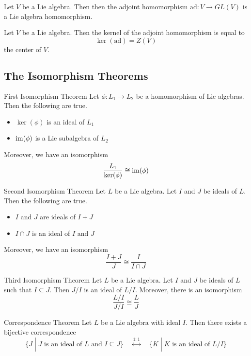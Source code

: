 \documentclass[a4paper]{article}
\begin{document}
\begin{lmm}{}{} Let $V$ be a Lie algebra. Then then the adjoint homomorphism $\text{ad}:V\to GL(V)$ is a Lie algebra homomorphism. 
\end{lmm}

\begin{lmm}{}{} Let $V$ be a Lie algebra. Then the kernel of the adjoint homomorphism is equal to $$\ker(\text{ad})=Z(V)$$ the center of $V$. 
\end{lmm}

\subsection{The Isomorphism Theorems}
\begin{thm}{First Isomorphism Theorem}{} Let $\phi:L_1\to L_2$ be a homomorphism of Lie algebras. Then the following are true. 
\begin{itemize}
\item $\ker(\phi)$ is an ideal of $L_1$
\item $\operatorname{im}(\phi)$ is a Lie subalgebra of $L_2$
\end{itemize}
Moreover, we have an isomorphism $$\frac{L_1}{\ker(\phi)}\cong\operatorname{im}(\phi)$$
\end{thm}

\begin{thm}{Second Isomorphism Theorem}{} Let $L$ be a Lie algebra. Let $I$ and $J$ be ideals of $L$. Then the following are true. 
\begin{itemize}
\item $I$ and $J$ are ideals of $I+J$
\item $I\cap J$ is an ideal of $I$ and $J$
\end{itemize}
Moreover, we have an isomorphism $$\frac{I+J}{J}\cong\frac{I}{I\cap J}$$
\end{thm}

\begin{thm}{Third Isomorphism Theorem}{} Let $L$ be a Lie algebra. Let $I$ and $J$ be ideals of $L$ such that $I\subseteq J$. Then $J/I$ is an ideal of $L/I$. Moreover, there is an isomorphism $$\frac{L/I}{J/I}\cong\frac{L}{J}$$
\end{thm}

\begin{thm}{Correspondence Theorem}{} Let $L$ be a Lie algebra with ideal $I$. Then there exists a bijective correspondence $$\{J\;|\;J\text{ is an ideal of }L\text{ and }I\subseteq J\}\;\;\;\;\overset{1:1}{\longleftrightarrow}\;\;\;\;\{K\;|\;K\text{ is an ideal of }L/I\}$$
\end{thm}
\end{document}
